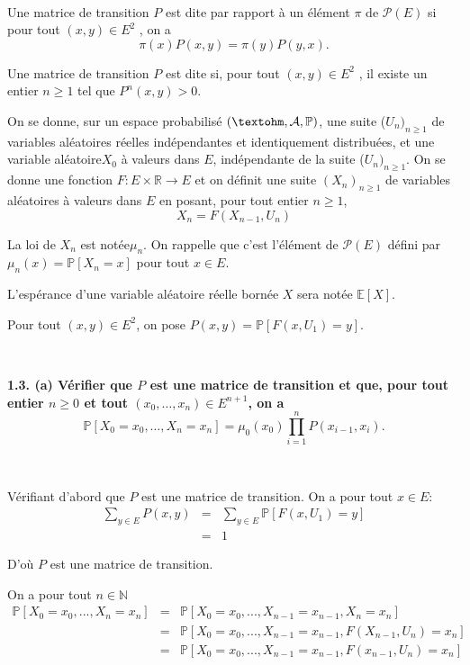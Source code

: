 \

Une matrice de transition $P$ est dite  par rapport
{\`a} un {\'e}l{\'e}ment $\pi$ de $\mathcal{P}(E)$ si pour tout $(x, y) \in
E^2$ , on a
\[ \pi (x) P (x, y) = \pi (y) P (y, x) . \]


Une matrice de transition $P$ est dite si, pour
tout $(x, y) \in E^2$ , il existe un entier $n \geqslant 1$ tel que $P^n (x,
y) > 0$.

On se donne, sur un espace probabilis{\'e} $({\textohm}, \mathcal{A},
\mathbb{P})$, une suite ($U_n)_{n \geqslant 1}$ de variables al{\'e}atoires
r{\'e}elles ind{\'e}pendantes et identiquement distribu{\'e}es, et une
variable al{\'e}atoire$X_0$ {\`a} valeurs dans $E$, ind{\'e}pendante de la
suite ($U_n)_{n \geqslant 1}$. On se donne une fonction $F : E \times
\mathbb{R} \rightarrow E$ et on d{\'e}finit une suite $(X_n)_{n \geqslant 1}$
de variables al{\'e}atoires {\`a} valeurs dans $E$ en posant, pour tout entier
$n \geqslant 1$,
\[ X_n = F (X_{n - 1}, U_n) \]


La loi de $X_n$ est not{\'e}e$\mu_n$. On rappelle que c'est l'{\'e}l{\'e}ment
de $\mathcal{P}(E)$ d{\'e}fini par $\mu_n (x) =\mathbb{P}[X_n = x]$ pour tout
$x \in E$.

L'esp{\'e}rance d'une variable al{\'e}atoire r{\'e}elle born{\'e}e $X$ sera
not{\'e}e $\mathbb{E}[X]$.

Pour tout $(x, y) \in E^2$, on pose $P (x, y) =\mathbb{P}[F (x, U_1) = y]$.

\

\textbf{1.3. (a) Vérifier que $P$ est une matrice de transition et que, pour tout entier $n \geqslant 0$ et tout $(x_0, \ldots, x_n) \in E^{n+1}$, on a }
\[
\mathbb{P}[X_0 = x_0, \ldots, X_n = x_n] = \mu_0(x_0) \prod_{i=1}^{n} P(x_{i-1}, x_i).
\]


\

V{\'e}rifiant d'abord que $P$ est une matrice de transition. On a pour tout
$x \in E$:
\begin{eqnarray*}
  \underset{y \in E}{\sum} P (x, y) & = & \underset{y \in E}{\sum}
  \mathbb{P}[F (x, U_1) = y]\\
  & = & 1
\end{eqnarray*}


D'o{\`u} $P$ est une matrice de transition.

On a pour tout $n \in \mathbb{N}$
\begin{eqnarray*}
  \mathbb{P}[X_0 = x_0, . . ., X_n = x_n] & = & \mathbb{P}[X_0 = x_0, . . .,
  X_{n - 1} = x_{n - 1}, X_n = x_n]\\
  & = & \mathbb{P}[X_0 = x_0, . . ., X_{n - 1} = x_{n - 1}, F (X_{n - 1},
  U_n) = x_n]\\
  & = & \mathbb{P}[X_0 = x_0, . . ., X_{n - 1} = x_{n - 1}, F (x_{n - 1},
  U_n) = x_n]
\end{eqnarray*}


